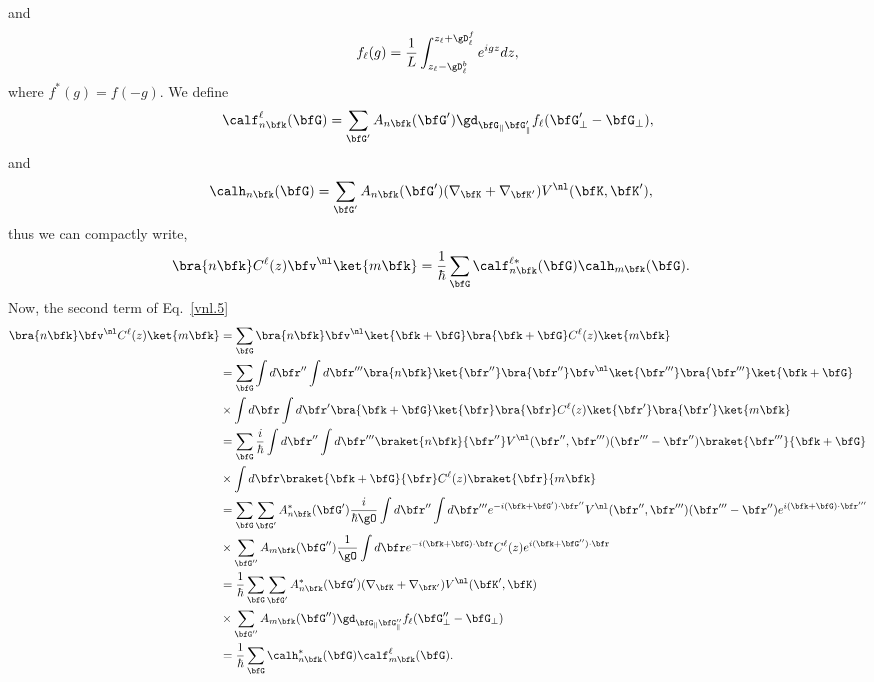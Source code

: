 and
\begin{align}\label{vnl.9}
f_\ell(g)=\frac{1}{L}\int_{z_\ell-\gD^b_\ell}^{z_\ell+\gD^f_\ell} e^{igz}dz  
 ,
\end{align}
where $f^*(g)=f(-g)$.
We define
\begin{align}\label{vnl.10}
\calf^\ell_{n\bfk}(\bfG) 
=
\sum_{\bfG'}
A_{n\bfk}(\bfG') 
\gd_{\bfG_\parallel \bfG'_\parallel}f_\ell(\bfG'_\perp-\bfG_\perp) 
,
\end{align}
and
\begin{align}\label{vnl.11}
\calh_{n\bfk}(\bfG)&=
\sum_{\bfG'}
A_{n\bfk}(\bfG') 
(\nabla_{\bfK}+\nabla_{\bfK'}) 
V^\nl(\bfK,\bfK') 
,
\end{align}
thus we can compactly write,
\begin{align}\label{vn.12}
\bra{n\bfk}C^\ell(z) 
\bfv^\nl\ket{m\bfk}
&=
\frac{1}{\hbar}
\sum_{\bfG}
\calf^{\ell*}_{n\bfk}(\bfG) 
\calh_{m\bfk}(\bfG) 
.
\end{align}
Now, the second term of Eq.~\eqref{vnl.5}
\begin{align}\label{vnl.12}
\bra{n\bfk}
\bfv^\nl
C^\ell(z) \ket{m\bfk}
&=\sum_{\bfG}
\bra{n\bfk}
\bfv^\nl 
\ket{\bfk+\bfG}
\bra{\bfk+\bfG}C^\ell(z)
\ket{m\bfk}
\nonumber\\
&=\sum_{\bfG}
\int d\bfr'' 
\int d\bfr''' 
\bra{n\bfk}
\ket{\bfr''}\bra{\bfr''} 
\bfv^\nl 
\ket{\bfr'''}\bra{\bfr'''} 
\ket{\bfk+\bfG}
\nonumber\\
&\times 
\int d\bfr 
\int d\bfr' 
\bra{\bfk+\bfG}
\ket{\bfr}\bra{\bfr}  
C^\ell(z) 
\ket{\bfr'}\bra{\bfr'}
\ket{m\bfk}
\nonumber\\
&=\sum_{\bfG}
\frac{i}{\hbar}
\int d\bfr'' 
\int d\bfr''' 
\braket{n\bfk}{\bfr''}
V^\nl(\bfr'',\bfr''')(\bfr'''-\bfr'') 
\braket{\bfr'''}{\bfk+\bfG}
\nonumber\\
&\times 
\int d\bfr 
\braket{\bfk+\bfG}{\bfr}
C^\ell(z) 
\braket{\bfr}{m\bfk}
\nonumber\\
&=\sum_{\bfG}
\sum_{\bfG'}
A^*_{n\bfk}(\bfG') 
\frac{i}{\hbar\gO}
\int d\bfr'' 
\int d\bfr''' 
e^{-i(\bfk+\bfG')\cdot\bfr''} 
V^\nl(\bfr'',\bfr''')(\bfr'''-\bfr'') 
e^{i(\bfk+\bfG)\cdot\bfr'''}
\nonumber\\
&\times 
\sum_{\bfG''}
A_{m\bfk}(\bfG'') 
\frac{1}{\gO}
\int d\bfr 
e^{-i(\bfk+\bfG)\cdot\bfr} 
C^\ell(z) 
e^{i(\bfk+\bfG'')\cdot\bfr}
\nonumber\\
&=
\frac{1}{\hbar}
\sum_{\bfG}
\sum_{\bfG'}
A^*_{n\bfk}(\bfG') 
(\nabla_\bfK+\nabla_{\bfK'})
V^\nl(\bfK',\bfK)
\nonumber\\
&\times 
\sum_{\bfG''}
A_{m\bfk}(\bfG'') 
\gd_{\bfG_\parallel \bfG''_\parallel}f_\ell(\bfG''_\perp-\bfG_\perp)
\nonumber\\
&=
\frac{1}{\hbar}
\sum_{\bfG}
\calh^*_{n\bfk}(\bfG) 
\calf^\ell_{m\bfk}(\bfG) 
.
\end{align}

